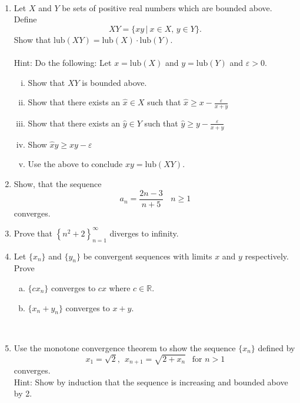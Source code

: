 \documentclass[12pt,letterpaper]{article}
\newcommand{\lub}{\text{lub}}
\theoremstyle{plain}
\theoremstyle{definition}
\begin{document}
\ \\
\begin{enumerate}[1.]
\item Let $X$ and $Y$ be sets of positive real numbers which are bounded above. Define \[XY=\{xy\, |\ x\in X,\, y\in Y\}.\] Show that $\lub(XY)=\lub(X)\cdot \lub(Y)$.  \\
\ \\
Hint: Do the following: 
Let $x=\lub(X)$ and $y=\lub(Y)$ and $\varepsilon>0$. 
\begin{enumerate}[(i)]
\item Show that $XY$ is bounded above.
\item Show that there exists an $\hat{x}\in X$ such that $\hat{x}\geq x-\frac{\varepsilon}{x+y}$
\item Show that there exists an $\hat{y}\in Y$ such that $\hat{y}\geq y-\frac{\varepsilon}{x+y}$
\item Show $\hat{x}\hat{y}\geq xy-\varepsilon$
\item Use the above to conclude $xy=\lub(XY)$.\\
\end{enumerate}
\item Show, that the sequence 
\[a_n=\frac{2n-3}{n+5}\ \ \ \ n\geq 1\] 
converges.
\ \\
\item Prove that $\left \{n^2+2\right \}_{n=1}^\infty$ diverges to infinity.       
\ \\
\item Let $\{x_n\}$ and $\{y_n\}$ be convergent sequences with limits $x$ and $y$ respectively. Prove
\begin{enumerate}[(a)]
\item $\{cx_n\}$ converges to $cx$ where $c\in \mathbb{R}$.
\item $\{x_n+y_n\}$ converges to $x+y$. 
\end{enumerate}
\ \\
\item Use the monotone convergence theorem to show the sequence $\{x_n\}$ defined by
\[x_1=\sqrt{2},\ \ x_{n+1}=\sqrt{2+x_{n}}\ \ \text{ for }n>1\]
converges.
\vspace{.15in}\\
Hint: Show by induction that the sequence is increasing and bounded above by 2.

\end{enumerate}
\end{document}
